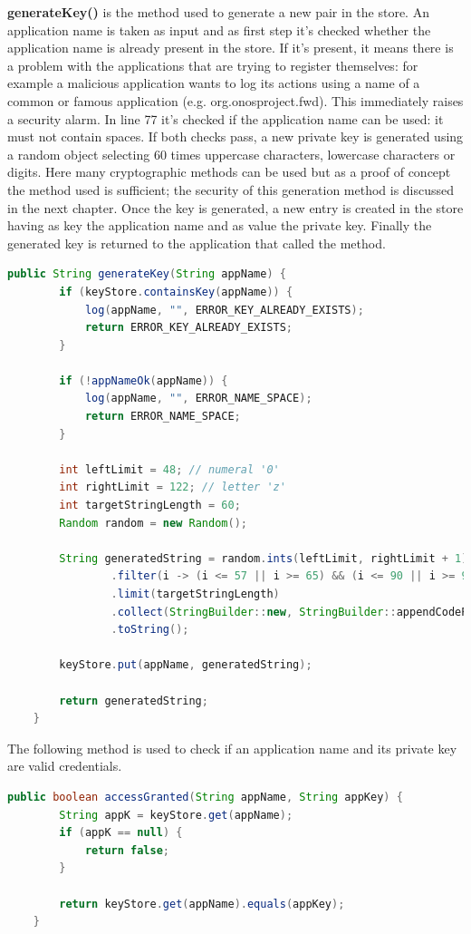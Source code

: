 \textbf{generateKey()} is the method used to generate a new pair in the store. An application name is taken as input and as first step it's checked whether the application name is already present in the store. If it's present, it means there is a problem with the applications that are trying to register themselves: for example a malicious application wants to log its actions using a name of a common or famous application (e.g. org.onosproject.fwd). This immediately raises a security alarm. In line 77 it's checked if the application name can be used: it must not contain spaces. If both checks pass, a new private key is generated using a random object selecting 60 times uppercase characters, lowercase characters or digits. Here many cryptographic methods can be used but as a proof of concept the method used is sufficient; the security of this generation method is discussed in the next chapter. Once the key is generated, a new entry is created in the store having as key the application name and as value the private key. Finally the generated key is returned to the application that called the method.
\begin{lstlisting}[language=java,firstnumber=71]
    public String generateKey(String appName) {
        if (keyStore.containsKey(appName)) {
            log(appName, "", ERROR_KEY_ALREADY_EXISTS);
            return ERROR_KEY_ALREADY_EXISTS;
        }

        if (!appNameOk(appName)) {
            log(appName, "", ERROR_NAME_SPACE);
            return ERROR_NAME_SPACE;
        }

        int leftLimit = 48; // numeral '0'
        int rightLimit = 122; // letter 'z'
        int targetStringLength = 60;
        Random random = new Random();

        String generatedString = random.ints(leftLimit, rightLimit + 1)
                .filter(i -> (i <= 57 || i >= 65) && (i <= 90 || i >= 97))
                .limit(targetStringLength)
                .collect(StringBuilder::new, StringBuilder::appendCodePoint, StringBuilder::append)
                .toString();

        keyStore.put(appName, generatedString);

        return generatedString;
    }
\end{lstlisting}

The following method is used to check if an application name and its private key are valid credentials.
\begin{lstlisting}[language=java,firstnumber=98]
    public boolean accessGranted(String appName, String appKey) {
        String appK = keyStore.get(appName);
        if (appK == null) {
            return false;
        }

        return keyStore.get(appName).equals(appKey);
    }
\end{lstlisting}


